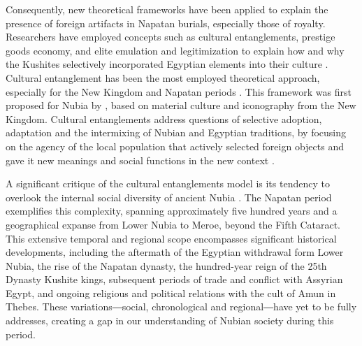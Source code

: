Consequently, new theoretical frameworks have been applied to explain the presence of foreign artifacts in Napatan burials, especially those of royalty. Researchers have employed concepts such as cultural entanglements, prestige goods economy, and elite emulation and legitimization to explain how and why the Kushites selectively incorporated Egyptian elements into their culture \parencites{smithNubiaEgyptInteraction1998, smithRevengeKushitesAssimilation2013, yellinEgyptianReligionIts1995, howleyRoyalPyramidTombs2015, howleyPowerRelationsAdoption2018, balandaDevelopmentRoyalFunerary2020}. Cultural entanglement \parencite{dietlerConsumption2010} has been the most employed theoretical approach, especially for the New Kingdom and Napatan periods \parencites{buzonEntanglementFormationAncient2016, gibbonMorphometricAssessmentAppendicular2016, schraderEverydayLifeCollapse2017, spencerIntroductionHistoryHistoriography2017, retzmannNewKingdomPopulation2019, viethNewKingdomTemple2019, budkaAcrossBorders2Living2020, smithNubianExperienceEgyptian2020, smithBackwaterPuritansRacism2022, buzonTumuliTombosInnovation2023, gasperiniAmaraWestCemeteries2023, buzonExploringIntersectionalIdentities2024}. This framework was first proposed for Nubia by \textcite{vanpeltRevisingEgyptoNubianRelations2013}, based on material culture and iconography from the New Kingdom. Cultural entanglements address questions of selective adoption, adaptation and the intermixing of Nubian and Egyptian traditions, by focusing on the agency of the local population that actively selected foreign objects and gave it new meanings and social functions in the new context \parencites{smithDesertRiverConsumption2014, smithColonialEntanglementsEgyptianization2014, buzonEntanglementFormationAncient2016, lohwasserInterkulturalitätVermittlungVerschränkung2017}.


A significant critique of the cultural entanglements model is its tendency to overlook the internal social diversity of ancient Nubia \parencites{lemosForeignObjectsLocal2020}. The Napatan period exemplifies this complexity, spanning approximately five hundred years and a geographical expanse from Lower Nubia to Meroe, beyond the Fifth Cataract. This extensive temporal and regional scope encompasses significant historical developments, including the aftermath of the Egyptian withdrawal form Lower Nubia, the rise of the Napatan dynasty, the hundred-year reign of the 25th Dynasty Kushite kings, subsequent periods of trade and conflict with Assyrian Egypt, and ongoing religious and political relations with the cult of Amun in Thebes. These variations―social, chronological and regional―have yet to be fully addresses, creating a gap in our understanding of Nubian society during this period.



